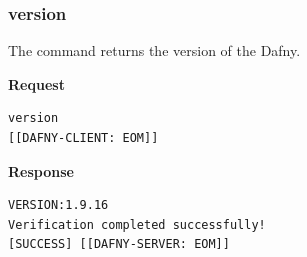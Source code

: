\subsubsection{version}
The command returns the version of the Dafny. 

\textbf{Request}
\begin{lstlisting}[language={},backgroundcolor=\color{background},basicstyle=\scriptsize\ttfamily]
version
[[DAFNY-CLIENT: EOM]]
\end{lstlisting}

\textbf{Response}
\begin{lstlisting}[language={},backgroundcolor=\color{background},basicstyle=\scriptsize\ttfamily]
VERSION:1.9.16
Verification completed successfully!
[SUCCESS] [[DAFNY-SERVER: EOM]]
\end{lstlisting}
